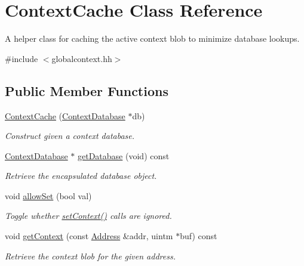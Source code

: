 \hypertarget{class_context_cache}{}\section{Context\+Cache Class Reference}
\label{class_context_cache}


A helper class for caching the active context blob to minimize database lookups.  




{\ttfamily \#include $<$globalcontext.\+hh$>$}

\subsection*{Public Member Functions}
\begin{DoxyCompactItemize}
\item 
\mbox{\hyperlink{class_context_cache_a352395a124a191f2f9d085e17dcb0059}{Context\+Cache}} (\mbox{\hyperlink{class_context_database}{Context\+Database}} $\ast$db)
\begin{DoxyCompactList}\small\item\em Construct given a context database. \end{DoxyCompactList}\item 
\mbox{\hyperlink{class_context_database}{Context\+Database}} $\ast$ \mbox{\hyperlink{class_context_cache_a4b722a698726c2f634a50c5b0af70c38}{get\+Database}} (void) const
\begin{DoxyCompactList}\small\item\em Retrieve the encapsulated database object. \end{DoxyCompactList}\item 
void \mbox{\hyperlink{class_context_cache_a10a0900d3b134ffd881a2ba5d6c9c9df}{allow\+Set}} (bool val)
\begin{DoxyCompactList}\small\item\em Toggle whether \mbox{\hyperlink{class_context_cache_ac9f411a6a52bed3b3e59607371766c8b}{set\+Context()}} calls are ignored. \end{DoxyCompactList}\item 
void \mbox{\hyperlink{class_context_cache_a541e54ada351d856bf06717bd8746714}{get\+Context}} (const \mbox{\hyperlink{class_address}{Address}} \&addr, uintm $\ast$buf) const
\begin{DoxyCompactList}\small\item\em Retrieve the context blob for the given address. \end{DoxyCompactList}\item 

\end{DoxyCompactItemize}

